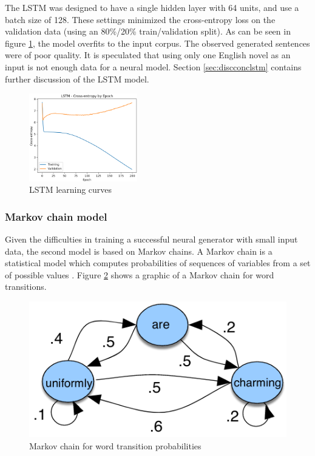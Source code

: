 \documentclass[11pt,a4paper]{article}
\begin{document}
The LSTM was designed to have a single hidden layer with 64 units, and use a batch size of 128. These settings minimized the cross-entropy loss on the validation data (using an 80\%/20\% train/validation split). As can be seen in figure \ref{fig:LearningCurves}, the model overfits to the input corpus. The observed generated sentences were of poor quality. It is speculated that using only one English novel as an input is not enough data for a neural model. Section \ref{sec:discconclstm} contains further discussion of the LSTM model.

\begin{figure}[h]
    \centering
    \includegraphics[width=0.42\textwidth]{LSTM_Loss.png}
    \caption{LSTM learning curves}
    \label{fig:LearningCurves}
\end{figure}

\subsubsection{Markov chain model}
\label{sec:markov}
Given the difficulties in training a successful neural generator with small input data, the second model is based on Markov chains. A Markov chain is a statistical model which computes probabilities of sequences of variables from a set of possible values \cite[Chapter~8]{jurafskymarkov}. Figure \ref{fig:markov} shows a graphic of a Markov chain for word transitions.

\begin{figure}
	\centering
	\includegraphics[scale=0.35]{./markov_chain.png}
	\caption{Markov chain for word transition probabilities \cite{jurafskymarkov}}
\label{fig:markov}
\end{figure}
\end{document}
